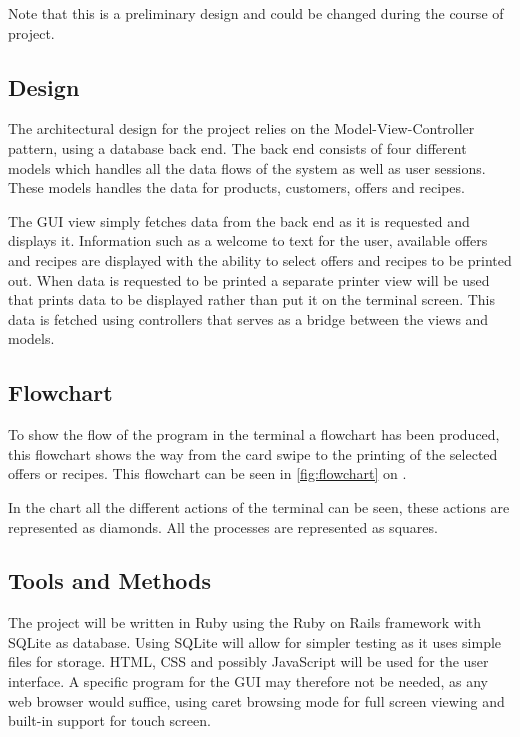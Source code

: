 \documentclass[a4paper,twoside,titlepage]{article}
\begin{document}
		Note that this is a preliminary design and could be changed during the course of project. 

	\subsection{Design}

		The architectural design for the project relies on the Model-View-Controller pattern, using a database back end. The back end consists of four different models which handles all the data flows of the system as well as user sessions. These models handles the data for products, customers, offers and recipes.

		The GUI view simply fetches data from the back end as it is requested and displays it. Information such as a welcome to text for the user, available offers and recipes are displayed with the ability to select offers and recipes to be printed out.
		When data is requested to be printed a separate printer view will be used that prints data to be displayed rather than put it on the terminal screen. This data is fetched using controllers that serves as a bridge between the views and models.

	\subsection{Flowchart}

		To show the flow of the program in the terminal a flowchart has been produced, this flowchart shows the way from the card swipe to the printing of the selected offers or recipes. This flowchart can be seen in \autoref{fig:flowchart} on \pagename{} \pageref{fig:flowchart}.

		In the chart all the different actions of the terminal can be seen, these actions are represented as diamonds. All the processes are represented as squares.
   
	\subsection{Tools and Methods}

		The project will be written in Ruby using the Ruby on Rails framework with SQLite as database. Using SQLite will allow for simpler testing as it uses simple files for storage. HTML, CSS and possibly JavaScript will be used for the user interface.
		A specific program for the GUI may therefore not be needed, as any web browser would suffice, using caret browsing mode for full screen viewing and built-in support for touch screen.
\end{document}
